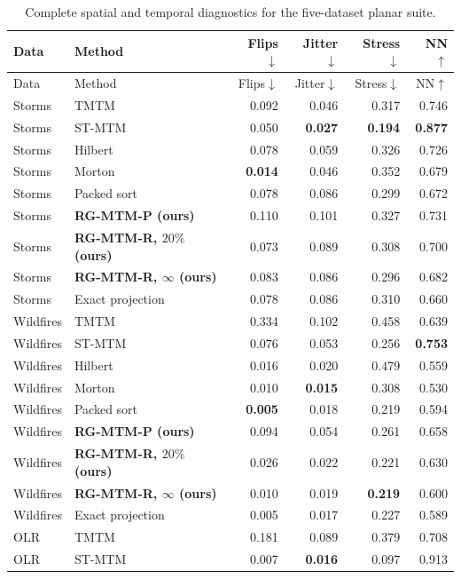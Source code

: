 \begingroup\small\setlength{\tabcolsep}{4pt}
\begin{longtable}{llrrrr}
\caption{Complete spatial and temporal diagnostics for the five-dataset planar suite.}\label{tab:hidden_quality_supp}\\\toprule
Data & Method & Flips$\downarrow$ & Jitter$\downarrow$ & Stress$\downarrow$ & NN$\uparrow$\\\midrule\endfirsthead
\toprule Data & Method & Flips$\downarrow$ & Jitter$\downarrow$ & Stress$\downarrow$ & NN$\uparrow$\\\midrule\endhead
\bottomrule\endfoot
Storms & TMTM & 0.092 & 0.046 & 0.317 & 0.746\\
Storms & ST-MTM & 0.050 & \textbf{0.027} & \textbf{0.194} & \textbf{0.877}\\
Storms & Hilbert & 0.078 & 0.059 & 0.326 & 0.726\\
Storms & Morton & \textbf{0.014} & 0.046 & 0.352 & 0.679\\
Storms & Packed sort & 0.078 & 0.086 & 0.299 & 0.672\\
Storms & \textbf{RG-MTM-P (ours)} & 0.110 & 0.101 & 0.327 & 0.731\\
Storms & \textbf{RG-MTM-R, $20\%$ (ours)} & 0.073 & 0.089 & 0.308 & 0.700\\
Storms & \textbf{RG-MTM-R, $\infty$ (ours)} & 0.083 & 0.086 & 0.296 & 0.682\\
Storms & Exact projection & 0.078 & 0.086 & 0.310 & 0.660\\
Wildfires & TMTM & 0.334 & 0.102 & 0.458 & 0.639\\
Wildfires & ST-MTM & 0.076 & 0.053 & 0.256 & \textbf{0.753}\\
Wildfires & Hilbert & 0.016 & 0.020 & 0.479 & 0.559\\
Wildfires & Morton & 0.010 & \textbf{0.015} & 0.308 & 0.530\\
Wildfires & Packed sort & \textbf{0.005} & 0.018 & 0.219 & 0.594\\
Wildfires & \textbf{RG-MTM-P (ours)} & 0.094 & 0.054 & 0.261 & 0.658\\
Wildfires & \textbf{RG-MTM-R, $20\%$ (ours)} & 0.026 & 0.022 & 0.221 & 0.630\\
Wildfires & \textbf{RG-MTM-R, $\infty$ (ours)} & 0.010 & 0.019 & \textbf{0.219} & 0.600\\
Wildfires & Exact projection & 0.005 & 0.017 & 0.227 & 0.589\\
OLR & TMTM & 0.181 & 0.089 & 0.379 & 0.708\\
OLR & ST-MTM & 0.007 & \textbf{0.016} & 0.097 & 0.913\\

\end{longtable}
